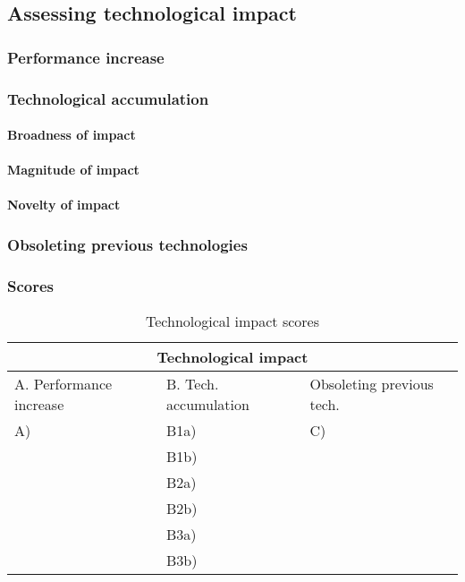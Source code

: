 \subsection{Assessing technological impact}
\subsubsection{Performance increase}

\subsubsection{Technological accumulation}
\paragraph{Broadness of impact}

\paragraph{Magnitude of impact}

\paragraph{Novelty of impact}

\subsubsection{Obsoleting previous technologies}

\subsubsection{Scores}
\begin{table}[h]
\centering
\begin{tabular}{l l l}
\hline
\multicolumn{3}{|c|}{Technological impact} \\
\hline
A. Performance increase & B. Tech. accumulation & Obsoleting previous tech.\\
A) & B1a) & C)\\ 
   & B1b) & \\ 
   & B2a) & \\
   & B2b) & \\
   & B3a) & \\
   & B3b) & \\
\hline
\end{tabular}
\caption{Technological impact scores}
\label{tbl:impactscores5}
\end{table}